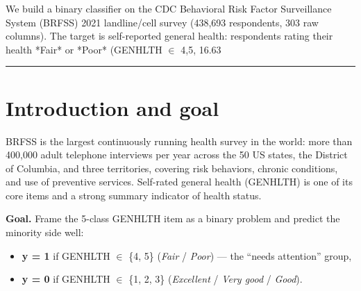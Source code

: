 \documentclass[11pt,a4paper]{article}
\providecommand{\tightlist}{\setlength{\itemsep}{2pt}\setlength{\parskip}{0pt}}
\begin{document}
{\small We build a binary classifier on the CDC Behavioral Risk Factor Surveillance System (BRFSS) 2021 landline/cell survey (438,693 respondents, 303 raw columns). The target is self-reported general health: respondents rating their health *Fair* or *Poor* (GENHLTH $\in$ {4,5}, 16.63%
\vspace{1.2em}
\hrule
\vspace{1.2em}

\tableofcontents
\newpage
\section{Introduction and goal}\label{introduction-and-goal}

BRFSS is the largest continuously running health survey in the world: more than 400,000 adult telephone interviews per year across the 50 US states, the District of Columbia, and three territories, covering risk behaviors, chronic conditions, and use of preventive services. Self-rated general health (GENHLTH) is one of its core items and a strong summary indicator of health status.

\textbf{Goal.} Frame the 5-class GENHLTH item as a binary problem and predict the minority side well:

\begin{itemize}
\tightlist
\item
  \textbf{y = 1} if GENHLTH $\in$ \{4, 5\} (\emph{Fair} / \emph{Poor}) --- the ``needs attention'' group,
\item
  \textbf{y = 0} if GENHLTH $\in$ \{1, 2, 3\} (\emph{Excellent} / \emph{Very good} / \emph{Good}).
\end{itemize}

}
\end{document}
